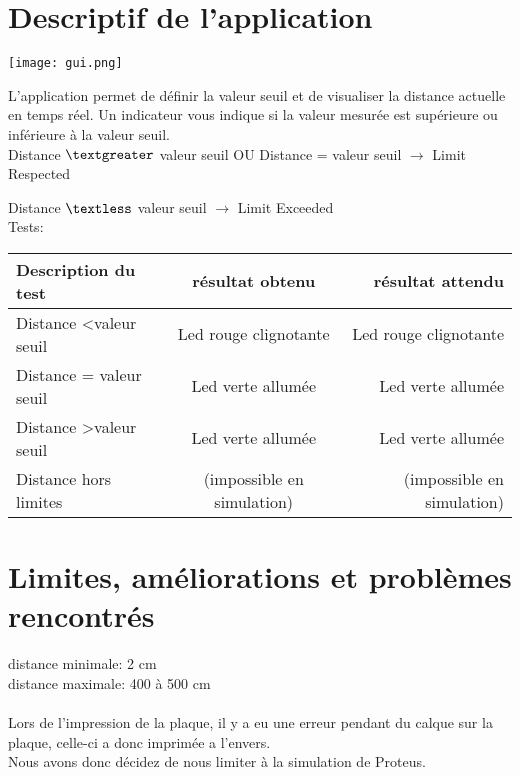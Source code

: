 \documentclass[a4paper]{article}
\begin{document}
\section{Descriptif de l’application}
\begin{center}
\texttt{[image: gui.png]}\\
\end{center}
L’application permet de définir la valeur seuil et de visualiser la distance actuelle en temps réel.
Un indicateur vous indique si la valeur mesurée est supérieure ou inférieure à la valeur seuil.\\

Distance $\textgreater$ valeur seuil OU Distance  = valeur seuil $\rightarrow$ Limit Respected

Distance $\textless$ valeur seuil $\rightarrow$ Limit Exceeded \\
\newpage
Tests: \\
\begin{center}
\begin{tabular}{ | l | c | r |}
\hline
Description du test & résultat obtenu & résultat attendu \\
\hline
Distance \textless  valeur seuil & Led rouge clignotante & Led rouge clignotante \\
\hline
Distance = valeur seuil & Led verte allumée & Led verte allumée \\
\hline
Distance  \textgreater  valeur seuil & Led verte allumée & Led verte allumée \\
\hline
Distance hors limites & (impossible en simulation) & (impossible en simulation) \\
\hline
\end{tabular}
\end{center}
\section{Limites, améliorations et problèmes rencontrés}

distance minimale: 2 cm \\
distance maximale: 400 à 500 cm \\
\\

Lors de l'impression de la plaque, il y a eu une erreur pendant du calque sur la plaque, celle-ci a donc imprimée a l'envers. \\
Nous avons donc décidez de nous limiter à la simulation de Proteus. \\
\end{document}

